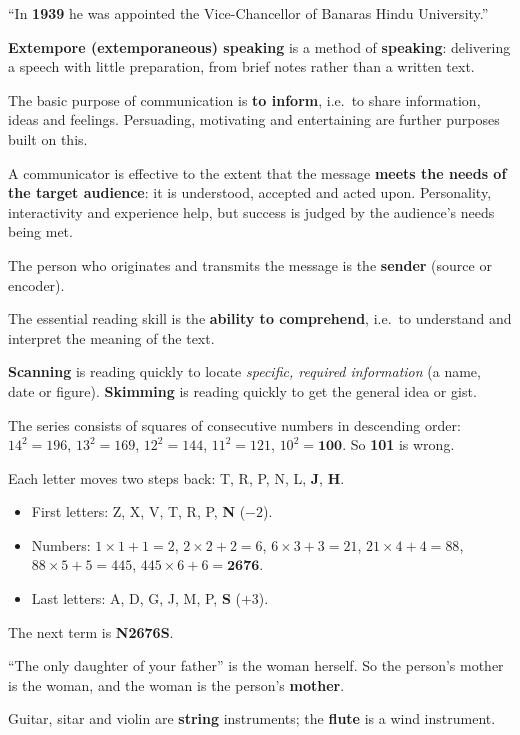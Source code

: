 ``In \textbf{1939} he was appointed the Vice-Chancellor of Banaras Hindu University.''

\textbf{Extempore (extemporaneous) speaking} is a method of \textbf{speaking}: delivering a speech with little preparation, from brief notes rather than a written text.

The basic purpose of communication is \textbf{to inform}, i.e.\ to share information, ideas and feelings. Persuading, motivating and entertaining are further purposes built on this.

A communicator is effective to the extent that the message \textbf{meets the needs of the target audience}: it is understood, accepted and acted upon. Personality, interactivity and experience help, but success is judged by the audience's needs being met.

The person who originates and transmits the message is the \textbf{sender} (source or encoder).

The essential reading skill is the \textbf{ability to comprehend}, i.e.\ to understand and interpret the meaning of the text.

\textbf{Scanning} is reading quickly to locate \emph{specific, required information} (a name, date or figure). \textbf{Skimming} is reading quickly to get the general idea or gist.

The series consists of squares of consecutive numbers in descending order: $14^2=196$, $13^2=169$, $12^2=144$, $11^2=121$, $10^2=\mathbf{100}$. So \textbf{101} is wrong.

Each letter moves two steps back: T, R, P, N, L, \textbf{J}, \textbf{H}.

\begin{itemize}
\item First letters: Z, X, V, T, R, P, \textbf{N} ($-2$).
\item Numbers: $1\times1+1=2$, $2\times2+2=6$, $6\times3+3=21$, $21\times4+4=88$, $88\times5+5=445$, $445\times6+6=\mathbf{2676}$.
\item Last letters: A, D, G, J, M, P, \textbf{S} ($+3$).
\end{itemize}
The next term is \textbf{N2676S}.

``The only daughter of your father'' is the woman herself. So the person's mother is the woman, and the woman is the person's \textbf{mother}.

Guitar, sitar and violin are \textbf{string} instruments; the \textbf{flute} is a wind instrument.

